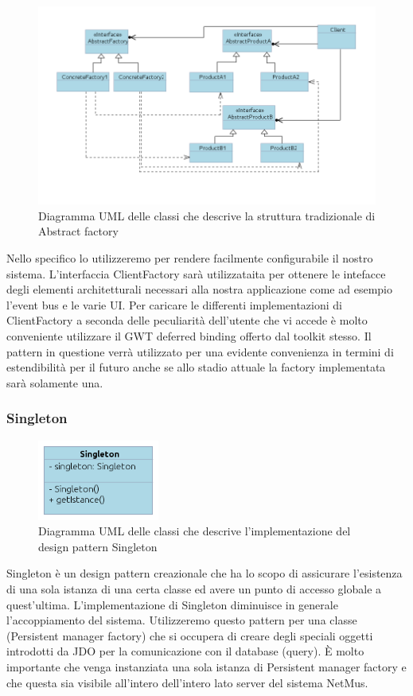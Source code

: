 \begin{figure}[h]
\centering
\includegraphics[width=16.5cm]{img/ST/AbstractFactory.png}
\caption{Diagramma UML delle classi che descrive la struttura tradizionale di
Abstract factory}
\end{figure}
Nello specifico lo utilizzeremo per rendere facilmente configurabile il nostro
sistema. L'interfaccia ClientFactory sar\`a utilizzataita per ottenere le
intefacce degli elementi architetturali necessari alla nostra applicazione come
ad esempio l'event bus e le varie UI.
Per caricare le differenti implementazioni di ClientFactory a seconda delle
peculiarit\`a dell'utente che vi accede \`e molto conveniente utilizzare il GWT
deferred binding offerto dal toolkit stesso.
Il pattern in questione verr\`a utilizzato per una evidente convenienza in termini
di estendibilit\`a per il futuro anche se allo stadio attuale la factory
implementata sar\`a solamente una.

\newpage
\subsubsection{Singleton}
\begin{figure}[h]
\centering
\includegraphics[width=4cm]{img/ST/Singleton.png}
\caption{Diagramma UML delle classi che descrive l'implementazione del design
pattern Singleton}
\end{figure}
Singleton \`e un design pattern creazionale che ha lo scopo di assicurare
l'esistenza di una sola istanza di una certa classe ed avere un punto di accesso
globale a quest'ultima. 
L'implementazione di Singleton diminuisce in generale l'accoppiamento del
sistema.
Utilizzeremo questo pattern per una classe (Persistent manager factory) che si
occupera di creare degli speciali oggetti introdotti da JDO per la
comunicazione con il database (query). \`E molto importante che venga instanziata una sola
istanza di Persistent manager factory e che questa sia visibile all'intero
dell'intero lato server del sistema NetMus. 

